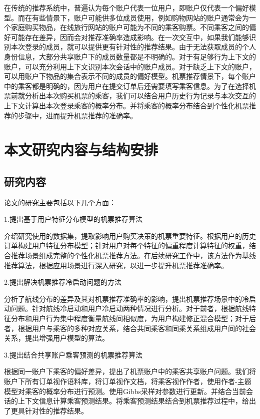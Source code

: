 在传统的推荐系统中，普遍认为每个账户代表一位用户，即账户仅代表一个偏好模型\parencite{kabutoya2010modeling}。而在有些情景下，账户可能供多位成员使用，例如购物网站的账户通常会为一个家庭购买物品，在线旅行网站的账户可能为不同的乘客购票。不同乘客之间的偏好可能存在差异，因而会对推荐准确率造成影响。在一次交互中，如果我们能够识别本次登录的成员，就可以提供更有针对性的推荐结果。由于无法获取成员的个人身份信息，大部分共享账户下的成员数量都是不明确的。对于有足够行为上下文\parencite{adomavicius2011context}的账户，可以充分利用上下文识别本次会话中的账户成员。对于缺乏上下文的账户\parencite{verstrepen2015top}，可以用账户下物品的集合表示不同的成员的偏好模型。机票推荐情景下，每个账户中的乘客都是明确的，因为用户在提交订单后还需要填写乘客信息。为了在选择机票前就分析出本次购买机票的乘客，我们可以结合用户历史行为记录与本次交互的上下文计算出本次登录乘客的概率分布。并将乘客的概率分布结合到个性化机票推荐的步骤中，进而提升机票推荐的准确率。



\section{本文研究内容与结构安排}
\subsection{研究内容}
论文的研究主要包括以下几个方面：

1.提出基于用户特征分布模型的机票推荐算法

介绍研究使用的数据集，提取影响用户购买决策的机票重要特征。根据用户的历史订单构建用户特征分布模型；针对用户对每个特征的偏重程度计算特征的权重，结合推荐场景组成完整的个性化机票推荐方法。在后续研究工作中，该方法作为基线推荐算法，根据应用场景进行深入研究，以进一步提升机票推荐准确率。

2.提出解决机票推荐冷启动问题的方法

分析了航线分布的差异及其对机票推荐准确率的影响，提出机票推荐场景中的冷启动问题。针对航线冷启动和用户冷启动两种情况进行分析。对于前者，根据航线特征分布和用户行为集中程度衡量航线间相似度，为用户构建修正混合模型；对于后者，根据用户与乘客的多种对应关系，结合共同乘客和同乘关系组成用户间的社会关系，提出增强用户模型的算法。


3.提出结合共享账户乘客预测的机票推荐算法

根据同一账户下乘客的偏好差异，提出了机票账户中的乘客共享账户问题。我们将账户下所有订单视作语料库，将订单视作文档，将乘客视作作者，使用作者-主题模型对乘客的概率分布进行预测。使用Gibbs采样对参数进行更新。并结合当前会话的上下文信息计算乘客预测结果。将乘客预测结果结合到机票推荐过程中，给出了更具针对性的推荐结果。


